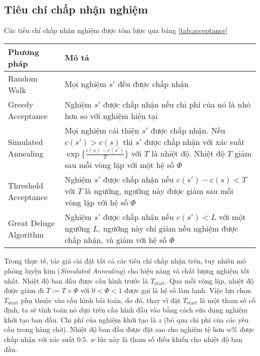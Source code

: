 \subsection{Tiêu chí chấp nhận nghiệm}

Các tiêu chí chấp nhận nghiệm được tóm lược qua bảng \ref{tab:acceptance}

\begin{table}[caption={Tiêu chí chấp nhận nghiệm}, label=tab:acceptance]
  \begin{tabularx}{\textwidth}{|l|X|}
    \hline
    Phương pháp & Mô tả \\ \hline
    Random Walk & Mọi nghiệm $s'$ đều được chấp nhận \\ \hline
    Greedy Acceptance & Nghiệm $s'$ được chấp nhận nếu chi phí của nó là nhỏ hơn so với nghiệm hiện tại \\ \hline
    Simulated Annealing & Mọi nghiệm cải thiện $s'$ được chấp nhận. Nếu $c(s') > c(s)$ thì $s'$ được chấp nhận với xác suất $\exp \{ \frac{c(s) - c(s')}{T} \}$ với $T$ là nhiệt độ. Nhiệt độ $T$ giảm sau mỗi vòng lặp với một hệ số $\Phi$ \\ \hline
    Threshold Acceptance & Nghiệm $s'$ được chấp nhận nếu $c(s') - c(s) < T$ với $T$ là ngưỡng, ngưỡng này được giảm sau mỗi vòng lặp với hệ số $\Phi$ \\ \hline
    Great Deluge Algorithm & Nghiệm $s'$ được chấp nhận nếu $c(s') < L$ với một ngưỡng $L$, ngưỡng này chỉ giảm nếu nghiệm được chấp nhận, và giảm với hệ số $\Phi$ \\ \hline
    \end{tabularx}
\end{table}
Trong thực tế, tác giả cài đặt tất cả các tiêu chí chấp nhận trên, tuy nhiên mô phỏng luyện kim (\textit{Simulated Annealing}) cho hiệu năng và chất lượng nghiệm tốt nhất. Nhiệt độ ban đầu được cấu hình trước là $T_{\text{start}}$. Qua mỗi vòng lặp, nhiệt độ được giảm đi $T := T \times \Phi$ với $0 < \Phi < 1$ được gọi là hệ số làm lạnh. Việc lựa chọn $T_{\text{start}}$ phụ thuộc vào cấu hình bài toán, do đó, thay vì đặt $T_{\text{start}}$ là một tham số cố định, ta sẽ tính toán nó dựa trên cầu hình đầu vào bằng cách sửa dụng nghiệm khởi tạo ban đầu. Chi phí của nghiệm khởi tạo là $z$ (bỏ qua chi phí của các yêu cầu trong hàng chờ). Nhiệt độ ban đầu được đặt sao cho nghiệm tệ hơn $w\%$ được chấp nhận với xác suất $0.5$. $w$ lúc này là tham số điều khiển cho nhiệt độ ban đầu. 